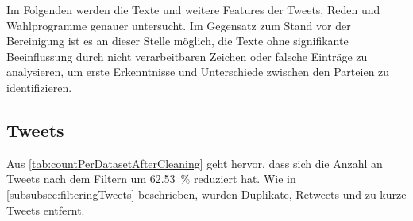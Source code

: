 Im Folgenden werden die Texte und weitere Features der Tweets, Reden und Wahlprogramme genauer untersucht. Im Gegensatz zum Stand vor der Bereinigung ist es an dieser Stelle möglich, die Texte ohne signifikante Beeinflussung durch nicht verarbeitbaren Zeichen oder falsche Einträge zu analysieren, um erste Erkenntnisse und Unterschiede zwischen den Parteien zu identifizieren.


\subsection*{Tweets}

Aus \autoref{tab:countPerDatasetAfterCleaning} geht hervor, dass sich die Anzahl an Tweets nach dem Filtern um \SI{62.53}{\percent} reduziert hat. Wie in \autoref{subsubsec:filteringTweets} beschrieben, wurden Duplikate, Retweets und zu kurze Tweets entfernt.



